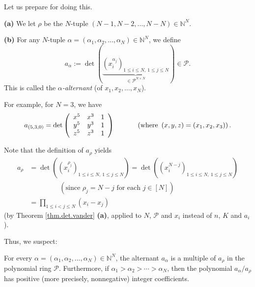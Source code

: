 Let us prepare for doing this.

\begin{definition}
\label{def.sf.alternants}\textbf{(a)} We let $\rho$ be the $N$-tuple $\left(
N-1,N-2,\ldots,N-N\right)  \in\mathbb{N}^{N}$. \medskip

\textbf{(b)} For any $N$-tuple $\alpha=\left(  \alpha_{1},\alpha_{2}%
,\ldots,\alpha_{N}\right)  \in\mathbb{N}^{N}$, we define%
\[
a_{\alpha}:=\det\left(  \underbrace{\left(  x_{i}^{\alpha_{j}}\right)  _{1\leq
i\leq N,\ 1\leq j\leq N}}_{\in\mathcal{P}^{N\times N}}\right)  \in
\mathcal{P}.
\]
This is called the $\alpha$\emph{-alternant} (of $x_{1},x_{2},\ldots,x_{N}$).
\end{definition}

For example, for $N=3$, we have%
\[
a_{\left(  5,3,0\right)  }=\det\left(
\begin{array}
[c]{ccc}%
x^{5} & x^{3} & 1\\
y^{5} & y^{3} & 1\\
z^{5} & z^{3} & 1
\end{array}
\right)  \ \ \ \ \ \ \ \ \ \ \left(  \text{where }\left(  x,y,z\right)
=\left(  x_{1},x_{2},x_{3}\right)  \right)  .
\]


Note that the definition of $a_{\rho}$ yields%
\begin{align}
a_{\rho}  &  =\det\left(  \left(  x_{i}^{\rho_{j}}\right)  _{1\leq i\leq
N,\ 1\leq j\leq N}\right)  =\det\left(  \left(  x_{i}^{N-j}\right)  _{1\leq
i\leq N,\ 1\leq j\leq N}\right) \nonumber\\
&  \ \ \ \ \ \ \ \ \ \ \ \ \ \ \ \ \ \ \ \ \left(  \text{since }\rho
_{j}=N-j\text{ for each }j\in\left[  N\right]  \right) \nonumber\\
&  =\prod_{1\leq i<j\leq N}\left(  x_{i}-x_{j}\right)
\label{eq.def.sf.alternants.arho=vdm}%
\end{align}
(by Theorem \ref{thm.det.vander} \textbf{(a)}, applied to $N$, $\mathcal{P}$
and $x_{i}$ instead of $n$, $K$ and $a_{i}$).

Thus, we suspect:

\begin{conjecture}
\label{conj.sf.schur-alt}For every $\alpha=\left(  \alpha_{1},\alpha
_{2},\ldots,\alpha_{N}\right)  \in\mathbb{N}^{N}$, the alternant $a_{\alpha}$
is a multiple of $a_{\rho}$ in the polynomial ring $\mathcal{P}$. Furthermore,
if $\alpha_{1}>\alpha_{2}>\cdots>\alpha_{N}$, then the polynomial $a_{\alpha
}/a_{\rho}$ has positive (more precisely, nonnegative) integer coefficients.
\end{conjecture}

